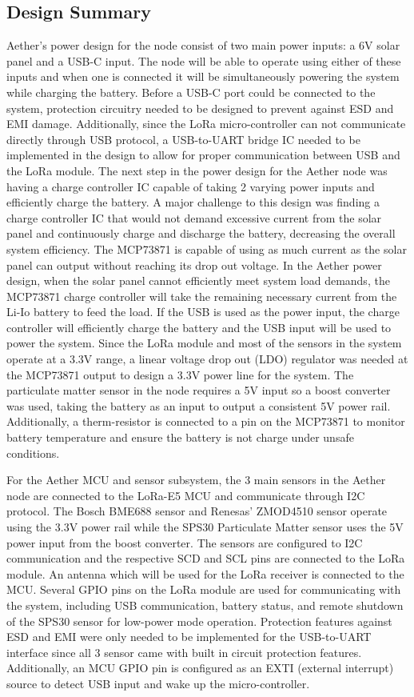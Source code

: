 \subsection{Design Summary}
Aether's power design for the node consist of two main power inputs: a 6V solar panel and a USB-C input. The node will be able to operate using either of these inputs and when one is connected it will be simultaneously powering the system while charging the battery. Before a USB-C port could be connected to the system, protection circuitry needed to be designed to prevent against ESD and EMI damage. Additionally, since the LoRa micro-controller can not communicate directly through USB protocol, a USB-to-UART bridge IC needed to be implemented in the design to allow for proper communication between USB and the LoRa module. The next step in the power design for the Aether node was having a charge controller IC capable of taking 2 varying power inputs and efficiently charge the battery. A major challenge to this design was finding a charge controller IC that would not demand excessive current from the solar panel and continuously charge and discharge the battery, decreasing the overall system efficiency. The MCP73871 is capable of using as much current as the solar panel can output without reaching its drop out voltage. In the Aether power design, when the solar panel cannot efficiently meet system load demands, the MCP73871 charge controller will take the remaining necessary current from the Li-Io battery to feed the load. If the USB is used as the power input, the charge controller will efficiently charge the battery and the USB input will be used to power the system. Since the LoRa module and most of the sensors in the system operate at a 3.3V range, a linear voltage drop out (LDO) regulator was needed at the MCP73871 output to design a 3.3V power line for the system. The particulate matter sensor in the node requires a 5V input so a boost converter was used, taking the battery as an input to output a consistent 5V power rail. Additionally, a therm-resistor is connected to a pin on the MCP73871 to monitor battery temperature and ensure the battery is not charge under unsafe conditions. 

For the Aether MCU and sensor subsystem, the 3 main sensors in the Aether node are connected to the LoRa-E5 MCU and communicate through I2C protocol. The Bosch BME688 sensor and Renesas' ZMOD4510 sensor operate using the 3.3V power rail while the SPS30 Particulate Matter sensor uses the 5V power input from the boost converter. The sensors are configured to I2C communication and the respective SCD and SCL pins are connected to the LoRa module. An antenna which will be used for the LoRa receiver is connected to the MCU. Several GPIO pins on the LoRa module are used for communicating with the system, including USB communication, battery status, and remote shutdown of the SPS30 sensor for low-power mode operation. Protection features against ESD and EMI were only needed to be implemented for the USB-to-UART interface since all 3 sensor came with built in circuit protection features. Additionally, an MCU GPIO pin is configured as an EXTI (external interrupt) source to detect USB input and wake up the micro-controller.
 